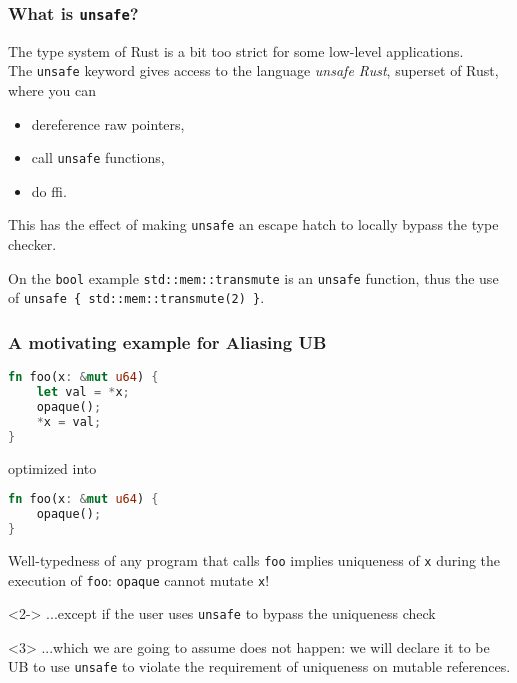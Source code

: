\begin{frame}[fragile,t]
    \frametitle{What is \texttt{unsafe}?}
    The type system of Rust is a bit too strict for some low-level applications.\\
    The \texttt{unsafe} keyword gives access to the language \textit{unsafe Rust},
    superset of Rust, where you can
    \begin{itemize}
        \item dereference raw pointers,
        \item call \texttt{unsafe} functions,
        \item do ffi.
    \end{itemize}

    This has the effect of making \texttt{unsafe} an escape hatch to locally bypass the type checker.
    \begin{exampleblock}{On the \texttt{bool} example}
        \texttt{std::mem::transmute} is an \texttt{unsafe} function, thus the
        use of \texttt{unsafe \{ std::mem::transmute(2) \}}.
    \end{exampleblock}
\end{frame}

\begin{frame}[fragile, t]
    \frametitle{A motivating example for Aliasing UB}
    \begin{lstlisting}[language=rust]
fn foo(x: &mut u64) {
    let val = *x;
    opaque();
    *x = val;
}
    \end{lstlisting}
    optimized into
    \begin{lstlisting}[language=rust]
fn foo(x: &mut u64) {
    opaque();
}
    \end{lstlisting}
    Well-typedness of any program that calls \texttt{foo} implies uniqueness
    of \texttt{x} during the execution of \texttt{foo}: \texttt{opaque} cannot mutate \texttt{x}!\\
    \begin{onlyenv}<2->
    ...except if the user uses \texttt{unsafe} to bypass the uniqueness check\\
    \end{onlyenv}
    \begin{onlyenv}<3>
    ...which we are going to assume does not happen: we will declare it to be UB
    to use \texttt{unsafe} to violate the requirement of uniqueness on mutable references.
    \end{onlyenv}
\end{frame}

